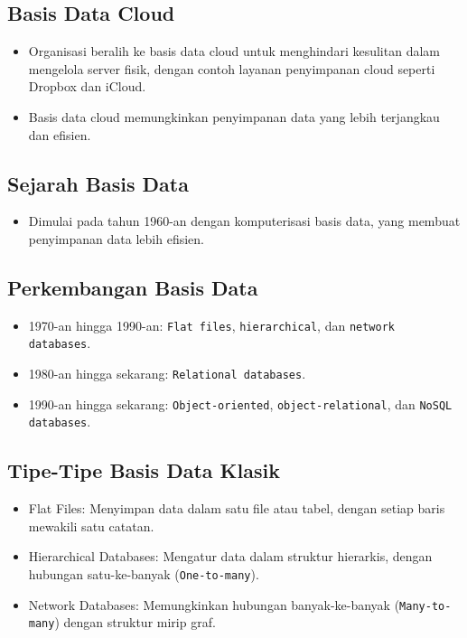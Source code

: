 \documentclass{article}
\begin{document}
\subsection{Basis Data Cloud}
\begin{itemize}
    \item Organisasi beralih ke basis data cloud untuk menghindari kesulitan dalam mengelola server fisik, dengan contoh layanan penyimpanan cloud seperti Dropbox dan iCloud.
    \item Basis data cloud memungkinkan penyimpanan data yang lebih terjangkau dan efisien.
\end{itemize}

\subsection{Sejarah Basis Data}
\begin{itemize}
    \item Dimulai pada tahun 1960-an dengan komputerisasi basis data, yang membuat penyimpanan data lebih efisien.
\end{itemize}

\subsection{Perkembangan Basis Data}
\begin{itemize}
    \item 1970-an hingga 1990-an: \texttt{Flat files}, \texttt{hierarchical}, dan \texttt{network databases}.
    \item 1980-an hingga sekarang: \texttt{Relational databases}.
    \item 1990-an hingga sekarang: \texttt{Object-oriented}, \texttt{object-relational}, dan \texttt{NoSQL databases}.
\end{itemize}

\subsection{Tipe-Tipe Basis Data Klasik}
\begin{itemize}
    \item Flat Files: Menyimpan data dalam satu file atau tabel, dengan setiap baris mewakili satu catatan.
    \item Hierarchical Databases: Mengatur data dalam struktur hierarkis, dengan hubungan satu-ke-banyak (\texttt{One-to-many}).
    \item Network Databases: Memungkinkan hubungan banyak-ke-banyak (\texttt{Many-to-many}) dengan struktur mirip graf.
\end{itemize}
\end{document}
